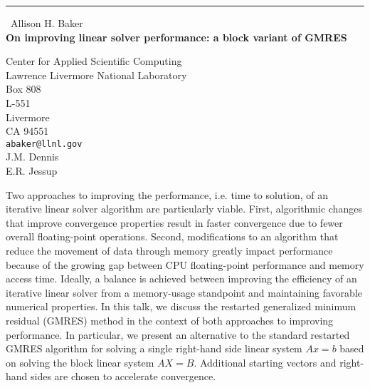\documentclass{report}
\begin{document}
\begin{center}
\rule{6in}{1pt} \
{\large Allison H. Baker \\
{\bf On improving linear solver performance: a block variant of GMRES}}

Center for Applied Scientific Computing \\ Lawrence Livermore National Laboratory  \\ Box 808 \\ L-551  \\ Livermore \\ CA 94551
\\
{\tt abaker@llnl.gov}\\
J.M. Dennis\\
E.R. Jessup\end{center}

Two approaches to improving the performance, i.e. time to solution, of
an iterative linear solver algorithm are particularly viable. First,
algorithmic changes that improve convergence properties result in
faster convergence due to fewer overall floating-point operations.
Second, modifications to an algorithm that reduce the movement of data
through memory greatly impact performance because of the growing gap
between CPU floating-point performance and memory access time.
Ideally, a balance is achieved between improving the efficiency of an
iterative linear solver from a memory-usage standpoint and maintaining
favorable numerical properties. In this talk, we discuss the
restarted generalized minimum residual (GMRES) method in the context
of both approaches to improving performance. In particular, we
present an alternative to the standard restarted GMRES algorithm for
solving a single right-hand side linear system $Ax=b$ based on solving
the block linear system $AX=B$. Additional starting vectors and
right-hand sides are chosen to accelerate convergence.
\end{document}
